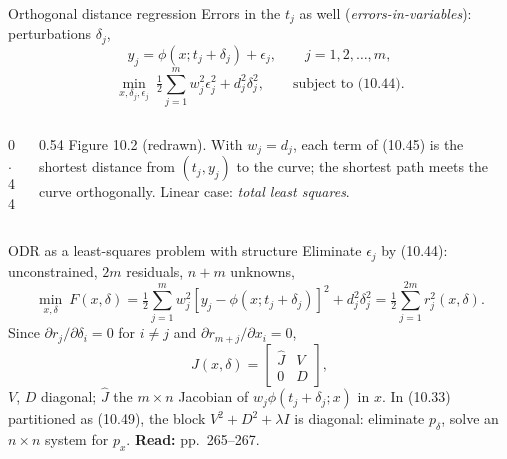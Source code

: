 \documentclass[aspectratio=169,12pt]{beamer}
\newcommand{\readbook}[1]{{\color{red}\textbf{Read:} #1}}
\begin{document}
\begin{frame}{Orthogonal distance regression}
  Errors in the $t_{j}$ as well (\emph{errors-in-variables}): perturbations $\delta_{j}$,
  \[ y_{j}=\phi(x;t_{j}+\delta_{j})+\epsilon_{j},\qquad j=1,2,\dots,m, \tag{10.44} \]
  \[ \min_{x,\delta_{j},\epsilon_{j}}\ \tfrac12\sum_{j=1}^{m}w_{j}^{2}\epsilon_{j}^{2}+d_{j}^{2}\delta_{j}^{2},\qquad\text{subject to (10.44)}. \tag{10.45} \]
  \begin{columns}[T,onlytextwidth]
    \begin{column}{0.44\textwidth}
      \begin{center}
      \end{center}
    \end{column}
    \begin{column}{0.54\textwidth}
      \small Figure 10.2 (redrawn). With $w_{j}=d_{j}$, each term of (10.45) is the shortest distance
      from $(t_{j},y_{j})$ to the curve; the shortest path meets the curve orthogonally.
      Linear case: \emph{total least squares}.
    \end{column}
  \end{columns}
\end{frame}

\begin{frame}{ODR as a least-squares problem with structure}
  Eliminate $\epsilon_{j}$ by (10.44): unconstrained, $2m$ residuals, $n+m$ unknowns,
  \[
    \min_{x,\delta}\ F(x,\delta)=\tfrac12\sum_{j=1}^{m}w_{j}^{2}[y_{j}-\phi(x;t_{j}+\delta_{j})]^{2}+d_{j}^{2}\delta_{j}^{2}
    =\tfrac12\sum_{j=1}^{2m}r_{j}^{2}(x,\delta) .
    \tag{10.46}
  \]
  Since $\partial r_{j}/\partial\delta_{i}=0$ for $i\ne j$ and $\partial r_{m+j}/\partial x_{i}=0$,
  \[ J(x,\delta)=\begin{bmatrix}\hat J&V\\0&D\end{bmatrix}, \tag{10.48} \]
  $V$, $D$ diagonal; $\hat J$ the $m\times n$ Jacobian of $w_{j}\phi(t_{j}+\delta_{j};x)$ in $x$. In (10.33)
  partitioned as (10.49), the block $V^{2}+D^{2}+\lambda I$ is diagonal: eliminate $p_{\delta}$, solve
  an $n\times n$ system for $p_{x}$. \readbook{pp.~265--267.}
\end{frame}
\end{document}
